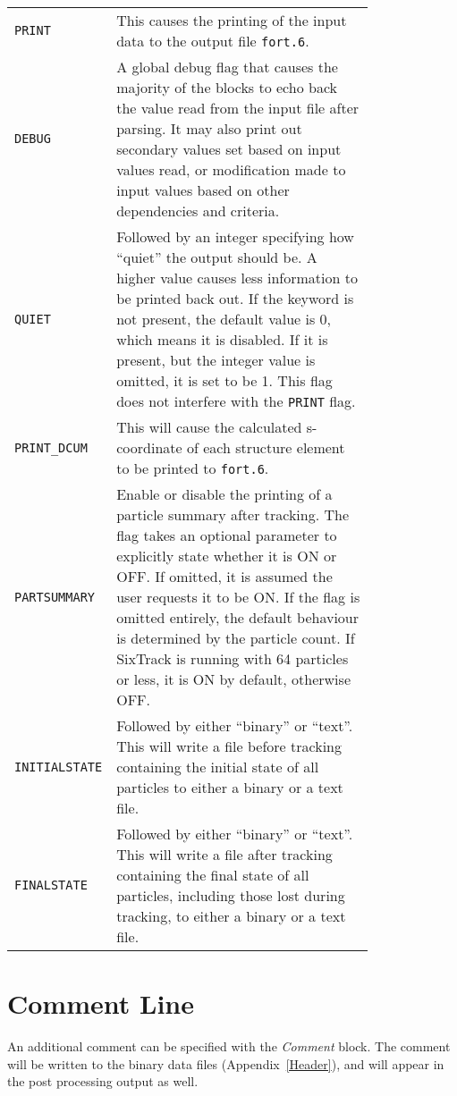 \bigskip
\begin{tabular}{@{}lp{0.8\linewidth}}
    \texttt{PRINT} & This causes the printing of the input data to the output file \texttt{fort.6}. \\
    \texttt{DEBUG} & A global debug flag that causes the majority of the blocks to echo back the value read from the input file after parsing. It may also print out secondary values set based on input values read, or modification made to input values based on other dependencies and criteria.\index{DEBUG}\\
    \texttt{QUIET} & Followed by an integer specifying how ``quiet'' the output should be. A higher value causes less information to be printed back out. If the keyword is not present, the default value is 0, which means it is disabled. If it is present, but the integer value is omitted, it is set to be 1. This flag does not interfere with the \texttt{PRINT} flag.\index{QUIET}\\
    \texttt{PRINT\_DCUM} & This will cause the calculated s-coordinate of each structure element to be printed to \texttt{fort.6}. \\
    \texttt{PARTSUMMARY} & Enable or disable the printing of a particle summary after tracking. The flag takes an optional parameter to explicitly state whether it is ON or OFF. If omitted, it is assumed the user requests it to be ON. If the flag is omitted entirely, the default behaviour is determined by the particle count. If SixTrack is running with 64 particles or less, it is ON by default, otherwise OFF.\\
    \texttt{INITIALSTATE} & Followed by either ``binary'' or ``text''. This will write a file before tracking containing the initial state of all particles to either a binary or a text file.\\
    \texttt{FINALSTATE} & Followed by either ``binary'' or ``text''. This will write a file after tracking containing the final state of all particles, including those lost during tracking, to either a binary or a text file.\\
\end{tabular}


\section{Comment Line} \label{ComLin}

An additional comment can be specified with the \textit{Comment} block.
The comment will be written to the binary data files (Appendix~\ref{Header}), and will appear in the post processing output as well.

